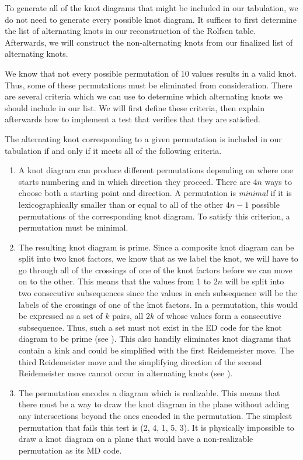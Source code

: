 \begin{paper}
To generate all of the knot diagrams that might be included in our tabulation,
we do not need to generate every possible knot diagram.
It suffices to first determine the list of alternating knots in our
reconstruction of the Rolfsen table.
Afterwards, we will construct the non-alternating knots from our finalized list
of alternating knots.

We know that not every possible permutation of 10 values results in a valid
knot.
Thus, some of these permutations must be eliminated from consideration.
There are several criteria which we can use to determine which alternating knots
we should include in our list.
We will first define these criteria, then explain afterwards how to implement a
test that verifies that they are satisfied.

The alternating knot corresponding to a given permutation is included in our
tabulation if and only if it meets all of the following criteria.

\begin{enumerate}
\item A knot diagram can produce different permutations depending on where one
starts numbering and in which direction they proceed.
There are $4n$ ways to choose both a starting point and direction.
A permutation is \textit{minimal} if it is lexicographically smaller than or
equal to all of the other $4n-1$ possible permutations of the corresponding knot
diagram.
To satisfy this criterion, a permutation must be minimal.

\item The resulting knot diagram is prime.
Since a composite knot diagram can be split into two knot factors, we know that
as we label the knot, we will have to go through all of the crossings of one of
the knot factors before we can move on to the other.
This means that the values from 1 to $2n$ will be split into two consecutive
subsequences since the values in each subsequence will be the labels of the
crossings of one of the knot factors.
In a permutation, this would be expressed as a set of $k$ pairs, all $2k$ of
whose values form a consecutive subsequence.
Thus, such a set must not exist in the ED code for the knot diagram to be prime
(see \figComposite).
This also handily eliminates knot diagrams that contain a kink and could be
simplified with the first Reidemeister move.
The third Reidemeister move and the simplifying direction of the second
Reidemeister move cannot occur in alternating knots (see \figMoves).

\item The permutation encodes a diagram which is realizable.
This means that there must be a way to draw the knot diagram in the plane
without adding any intersections beyond the ones encoded in the permutation.
The simplest permutation that fails this test is (2, 4, 1, 5, 3).
It is physically impossible to draw a knot diagram on a plane that would have a
non-realizable permutation as its MD code.


\end{enumerate}
\end{paper}
